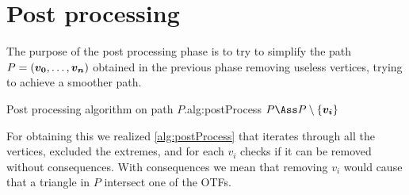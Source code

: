\documentclass[dissertation.tex]{subfiles}
\begin{document}
\section{Post processing}\label{sec:postPro}
The purpose of the post processing phase is to try to simplify the
path $P=(\boldsymbol{v_0},\dots,\boldsymbol{v_n})$ obtained in the previous phase
removing useless vertices, trying
to achieve a smoother path.

\begin{algo}{Post processing algorithm on path $P$.}{alg:postProcess}
  \State $P\Ass P\setminus\{\ve{v_i}\}$
  \EndIf
  \EndIf
  \EndFor
  \EndProcedure
\end{algo}
For obtaining this we realized \cref{alg:postProcess} that
iterates through all the vertices, excluded the extremes, and for each
$v_i$ checks if it can be removed without consequences. With
consequences we mean that removing $v_i$ would cause that a triangle
in $P$ intersect one of the \acp{OTF}.
\end{document}
